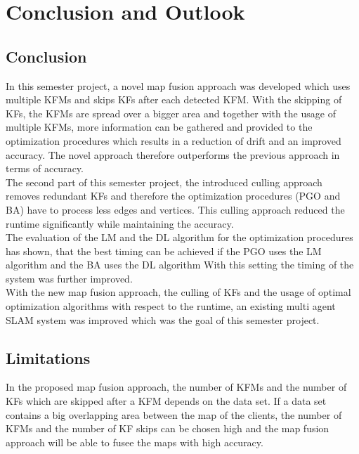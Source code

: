 \chapter{Conclusion and Outlook}

\section{Conclusion}
In this semester project, a novel map fusion approach was developed which uses multiple \acp{KFM} and skips \acp{KF} after each detected \ac{KFM}. With the skipping of \acp{KF}, the \acp{KFM} are spread over a bigger area and together with the usage of multiple \acp{KFM}, more information can be gathered and provided to the optimization procedures which results in a reduction of drift and an improved accuracy. The novel approach therefore outperforms the previous approach in terms of accuracy.\\

The second part of this semester project, the introduced culling approach removes redundant \acp{KF} and therefore the optimization procedures (\ac{PGO} and \ac{BA}) have to process less edges and vertices. This culling approach reduced the runtime significantly while maintaining the accuracy.\\

The evaluation of the \ac{LM} and the \ac{DL} algorithm for the optimization procedures has shown, that the best timing can be achieved if the \ac{PGO} uses the \ac{LM} algorithm and the \ac{BA} uses the \ac{DL} algorithm With this setting the timing of the system was further improved.\\

With the new map fusion approach, the culling of \acp{KF} and the usage of optimal optimization algorithms with respect to the runtime, an existing multi agent \ac{SLAM} system was improved which was the goal of this semester project.

\section{Limitations}
In the proposed map fusion approach, the number of \acp{KFM} and the number of \acp{KF} which are skipped after a \ac{KFM} depends on the data set. If a data set contains a big overlapping area between the map of the clients, the number of \acp{KFM} and the number of \ac{KF} skips can be chosen high and the map fusion approach will be able to fusee the maps with high accuracy.\\

